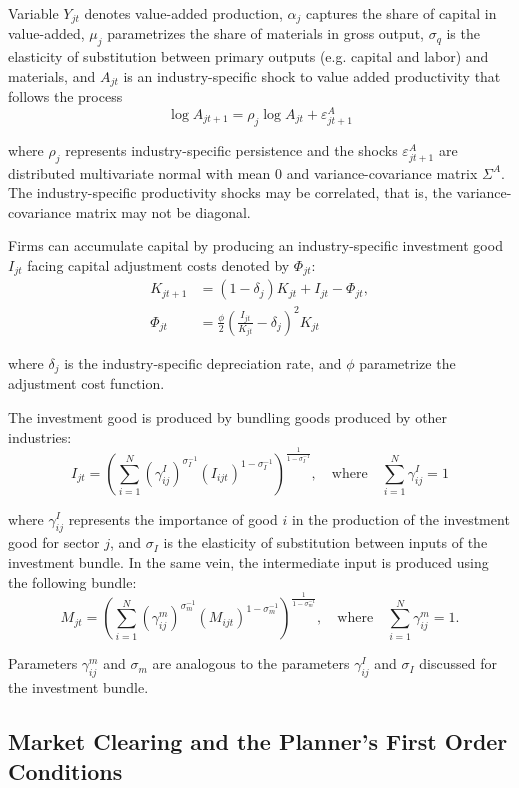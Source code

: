Variable $Y_{jt}$ denotes value-added production, $\alpha_{j}$ captures
the share of capital in value-added, $\mu_{j}$ parametrizes the share
of materials in gross output, $\sigma_{q}$ is the elasticity of substitution
between primary outputs (e.g. capital and labor) and materials, and
$A_{jt}$ is an industry-specific shock to value added productivity
that follows the process
\[
\log A_{jt+1}=\rho_{j}\log A_{jt}+\varepsilon_{jt+1}^{A}
\]

where $\rho_{j}$ represents industry-specific persistence and the
shocks $\varepsilon_{jt+1}^{A}$ are distributed multivariate normal
with mean $0$ and variance-covariance matrix $\Sigma^{A}$. The industry-specific
productivity shocks may be correlated, that is, the variance-covariance
matrix may not be diagonal. 

Firms can accumulate capital by producing an industry-specific investment
good $I_{jt}$ facing capital adjustment costs denoted by $\Phi_{jt}$:
\begin{align*}
K_{jt+1} & =(1-\delta_{j})K_{jt}+I_{jt}-\Phi_{jt},\\
\Phi_{jt} & =\frac{\phi}{2}\left(\frac{{I_{jt}}}{K_{jt}}-\delta_{j}\right)^{2}K_{jt}
\end{align*}

where $\delta_{j}$ is the industry-specific depreciation rate, and
$\phi$ parametrize the adjustment cost function. 

The investment good is produced by bundling goods produced by other
industries:
\[
I_{jt}=\left(\sum_{i=1}^{N}\left(\gamma_{ij}^{I}\right)^{\sigma_{I}^{-1}}\left(I_{ijt}\right)^{1-\sigma_{I}^{-1}}\right)^{\frac{1}{1-\sigma_{I}^{-1}}},\quad\text{{where}}\quad\sum_{i=1}^{N}\gamma_{ij}^{I}=1
\]

where $\gamma_{ij}^{I}$ represents the importance of good $i$ in
the production of the investment good for sector $j$, and $\sigma_{I}$
is the elasticity of substitution between inputs of the investment
bundle. In the same vein, the intermediate input is produced using
the following bundle:
\[
M_{jt}=\left(\sum_{i=1}^{N}\left(\gamma_{ij}^{m}\right)^{\sigma_{m}^{-1}}\left(M_{ijt}\right)^{1-\sigma_{m}^{-1}}\right)^{\frac{1}{1-\sigma_{m}^{-1}}},\quad\text{{where}}\quad\sum_{i=1}^{N}\gamma_{ij}^{m}=1.
\]

Parameters $\gamma_{ij}^{m}$ and $\sigma_{m}$ are analogous to the parameters $\gamma_{ij}^{I}$ and $\sigma_{I}$
discussed for the investment bundle.

\subsection{Market Clearing and the Planner's First Order Conditions}


